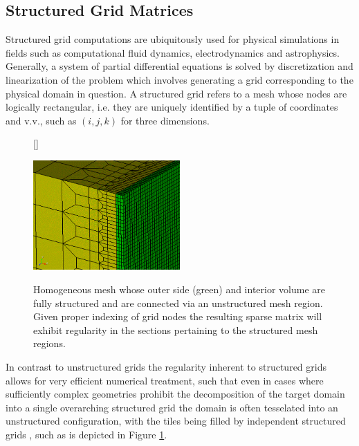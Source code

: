 \documentclass{article}
\begin{document}
  \subsection{Structured Grid Matrices}

    Structured grid computations are ubiquitously used for physical simulations in fields such as computational fluid dynamics, electrodynamics and astrophysics. Generally, a system of partial differential equations is solved by discretization and linearization of the problem which involves generating a grid corresponding to the physical domain in question. A structured grid refers to a mesh whose nodes are logically rectangular, i.e. they are uniquely identified by a tuple of coordinates and v.v., such as $(i, j, k)$ for three dimensions.

    \begin{figure}
      [\FBwidth]
      {\caption{Homogeneous mesh whose outer side (green) and interior volume are fully structured and are connected via an unstructured mesh region. Given proper indexing of grid nodes the resulting sparse matrix will exhibit regularity in the sections pertaining to the structured mesh regions.}
      \label{fig:refined_structured_grid}}
      {\includegraphics[width=0.5\textwidth]{fig/refined_structured_grid}}
    \end{figure}

    In contrast to unstructured grids the regularity inherent to structured grids allows for very efficient numerical treatment, such that even in cases where sufficiently complex geometries prohibit the decomposition of the target domain into a single overarching structured grid the domain is often tesselated into an unstructured configuration, with the tiles being filled by independent structured grids \cite{Badcock2000}, such as is depicted in Figure \ref{fig:refined_structured_grid}.
\end{document}
